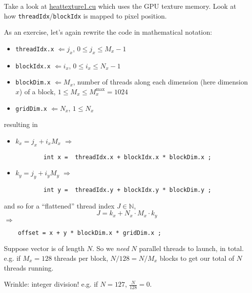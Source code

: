 \documentclass[10pt]{amsart}
\begin{document}
\begin{multicols*}{2}
Take a look at \href{https://github.com/ernestyalumni/CompPhys/blob/master/CUDA-By-Example/heattexture1.cu}{heattexture1.cu} which uses the GPU texture memory.  Look at how \verb|threadIdx|/\verb|blockIdx| is mapped to pixel position.

As an exercise, let's again rewrite the code in mathematical notation:
\begin{itemize}\label{List:threadblockdict}
	\item \verb|threadIdx.x| $\Longleftarrow j_x$, $0\leq j_x \leq M_x -1$ 
	\item \verb|blockIdx.x| $\Longleftarrow i_x$, $0\leq i_x \leq N_x -1$
	\item \verb|blockDim.x| $\Longleftarrow M_x$, number of threads along each dimension (here dimension $x$) of a block, $1 \leq M_x \leq M_x^{\text{max}} = 1024$
	\item \verb|gridDim.x| $\Longleftarrow N_x$, $1\leq N_x$
\end{itemize}
resulting in
\begin{itemize}
	\item $k_x = j_x +i_x M_x$ $\Longrightarrow$
	\begin{lstlisting}
		int x =  threadIdx.x + blockIdx.x * blockDim.x ;
	\end{lstlisting}
	\item $k_y = j_y +i_y M_y$ $\Longrightarrow$
	\begin{lstlisting}
		int y =  threadIdx.y + blockIdx.y * blockDim.y ;
	\end{lstlisting}
\end{itemize}
and so for a ``flattened'' thread index $J \in \mathbb{N}$,
\[
J = k_x + N_x\cdot M_x \cdot k_y
\]
$\Longrightarrow $
\begin{lstlisting}
	offset = x + y * blockDim.x * gridDim.x ;
\end{lstlisting}

Suppose vector is of length $N$.  So we \emph{need} $N$ parallel threads to launch, in total. \\
e.g. if $M_x = 128$ threads per block, $N/128 = N/M_x$ blocks to get our total of $N$ threads running.

Wrinkle: integer division!  e.g. if $N=127 $, $\frac{N}{128} = 0$.


\end{multicols*}
\end{document}
